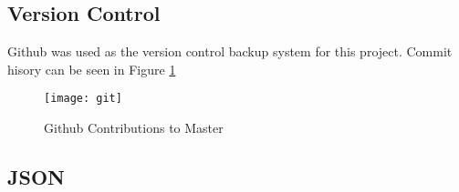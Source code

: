 \subsection*{Version Control}
Github was used as the version control backup system for this project.
Commit hisory can be seen in Figure \ref{fig:git}

\begin{figure}[h]
    \texttt{[image: git]}
    \caption{Github Contributions to Master}
    \label{fig:git}
\end{figure}

\subsection*{JSON}






